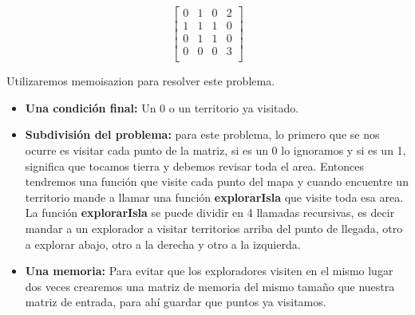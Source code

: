 \begin{equation}
\begin{bmatrix}
0 & 1 & 0 & 2\\
1 & 1 & 1 &0\\
0 & 1 & 1 & 0\\
0 & 0 & 0 & 3\\
\end{bmatrix}
\end{equation}

Utilizaremos memoisazion para resolver este problema.

\begin{itemize}
    \item \textbf{Una condición final:} Un 0 o un territorio ya visitado.
    \item \textbf{Subdivisión del problema:} para este problema, lo primero que se nos ocurre es visitar cada punto de la matriz, si es un 0 lo ignoramos y si es un 1, significa que tocamos tierra y debemos revisar toda el area. Entonces tendremos una función que visite cada punto del mapa y cuando encuentre un territorio mande a llamar una función \textbf{explorarIsla} que visite toda esa area.
    La función \textbf{explorarIsla} se puede dividir en 4 llamadas recursivas, es decir mandar a un explorador a visitar territorios arriba del punto de llegada, otro a explorar abajo, otro a la derecha y otro a la izquierda.
    \item \textbf{Una memoria:} Para evitar que los exploradores visiten en el mismo lugar dos veces crearemos una matriz de memoria del mismo tamaño que nuestra matriz de entrada, para ahí guardar que puntos ya visitamos.
\end{itemize}



